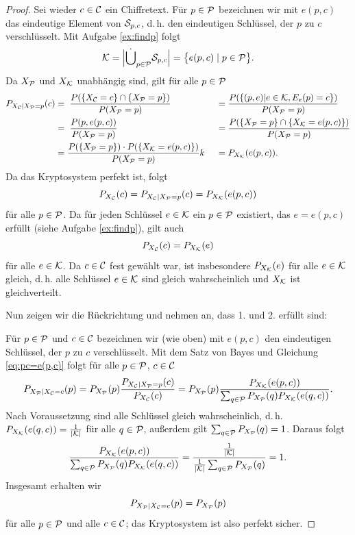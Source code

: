 \begin{proof}
 Sei wieder $c \in \mathcal C$ ein Chiffretext. Für $p \in \mathcal P$ bezeichnen wir mit $e(p, c)$ das eindeutige Element von $\mathcal S_{p, c}$, d.\,h. den eindeutigen Schlüssel, der $p$ zu $c$ verschlüsselt. Mit Aufgabe \ref{ex:findp} folgt
 \[\mathcal K = \left|\dot\bigcup_{p \in \mathcal P} \mathcal S_{p, c}\right| = \big\{e(p, c)\mid p \in \mathcal P\big\}.\]
 Da $X_{\mathcal P}$ und $X_{\mathcal K}$ unabhängig sind, gilt für alle $p \in \mathcal P$ 
 \begin{equation}\label{eq:pc=e(p,c)}
 \begin{aligned}
 P_{X_{\mathcal C}|X_{\mathcal P} = p}(c) & =\; \frac{P(\{X_{\mathcal C} =c\} \cap \{X_{\mathcal P} = p\})}{P(X_{\mathcal P} = p)} && \; = \frac{P(\{(p, e)| e \in \mathcal K, E_e(p) = c\})}{P(X_{\mathcal P} = p)} \\
 & = \; \frac{P(p, e(p, c))}{P(X_{\mathcal P} = p)} && \; = \frac{P(\{X_{\mathcal P} = p\} \cap \{X_{\mathcal K} = e(p, c)\})}{P(X_{\mathcal P} = p)} \\
 & = \frac{ P(\{X_{\mathcal P} = p\}) \cdot P(\{X_{\mathcal K} = e(p, c)\})}{P(X_{\mathcal P} = p)} k  && \;=  P_{X_{\mathcal K}}(e(p, c)). 
 \end{aligned}
 \end{equation}
Da das Kryptosystem perfekt ist, folgt 
\[P_{X_{\mathcal C}}(c) = P_{X_{\mathcal C}|X_{\mathcal P} = p}(c)  =  P_{X_{\mathcal K}}(e(p, c))\]
für alle $p \in \mathcal P$. Da für jeden Schlüssel $e \in \mathcal K$ ein $p \in \mathcal P$ existiert, das $e = e(p, c)$ erfüllt (siehe Aufgabe \ref{ex:findp}), gilt auch 
\[P_{X_{\mathcal C}}(c) = P_{X_{\mathcal K}}(e)\]
für alle $e \in \mathcal K$. Da $c \in \mathcal C$ fest gewählt war, ist insbesondere $P_{X_{\mathcal K}}(e)$ für alle $e \in \mathcal K$ gleich, d.\,h. alle Schlüssel $e \in \mathcal K$ sind gleich wahrscheinlich und $X_{\mathcal K}$ ist gleichverteilt.
 
 Nun zeigen wir die Rückrichtung und nehmen an, dass 1. und 2. erfüllt sind:
 
Für $p \in \mathcal P$ und $c \in \mathcal C$ bezeichnen wir (wie oben) mit $e(p, c)$ den eindeutigen Schlüssel, der $p$ zu $c$ verschlüsselt. Mit dem Satz von Bayes und Gleichung \ref{eq:pc=e(p,c)} folgt für alle $p \in \mathcal P$, $c \in \mathcal C$
\[P_{X_{\mathcal P}|X_{\mathcal C} = c}(p) = P_{X_{\mathcal P}}(p)\frac{P_{X_{\mathcal C}|X_{\mathcal P} = p}(c)}{P_{X_{\mathcal C}}(c)} =  P_{X_{\mathcal P}}(p)\frac{P_{X_{\mathcal K}}(e(p, c))}{\sum_{q \in \mathcal P} P_{X_{\mathcal P}}(q)P_{X_{\mathcal K}}(e(q, c))}.\]
Nach Voraussetzung sind alle Schlüssel gleich wahrscheinlich, d.\,h. $P_{X_{\mathcal K}}(e(q, c)) = \frac{1}{|\mathcal K|}$ für alle $q \in \mathcal P$, außerdem gilt $\sum_{q \in \mathcal P} P_{X_{\mathcal P}}(q) = 1$. Daraus folgt
\[\frac{P_{X_{\mathcal K}}(e(p, c))}{\sum_{q \in \mathcal P} P_{X_{\mathcal P}}(q)P_{X_{\mathcal K}}(e(q, c))} = \frac{\frac{1}{|\mathcal K|}}{\frac{1}{|\mathcal K|}\sum_{q \in \mathcal P} P_{X_{\mathcal P}}(q)} = 1.\]
Insgesamt erhalten wir
\[P_{X_{\mathcal P}|X_{\mathcal C} = c}(p) =  P_{X_{\mathcal P}}(p)\]
für alle $p \in \mathcal P$ und alle $c \in \mathcal C$; das Kryptosystem ist also perfekt sicher.
\end{proof}

